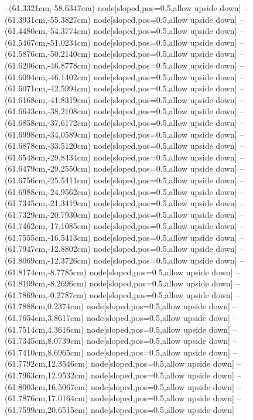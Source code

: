 --(61.3321cm,-58.6347cm) node[sloped,pos=0.5,allow upside down]{\ArrowIn}
--(61.3931cm,-55.3827cm) node[sloped,pos=0.5,allow upside down]{\ArrowIn}
--(61.4480cm,-54.3774cm) node[sloped,pos=0.5,allow upside down]{\ArrowIn}
--(61.5467cm,-51.0234cm) node[sloped,pos=0.5,allow upside down]{\ArrowIn}
--(61.5876cm,-50.2140cm) node[sloped,pos=0.5,allow upside down]{\arrowIn}
--(61.6206cm,-46.8778cm) node[sloped,pos=0.5,allow upside down]{\ArrowIn}
--(61.6094cm,-46.1402cm) node[sloped,pos=0.5,allow upside down]{\arrowIn}
--(61.6071cm,-42.5994cm) node[sloped,pos=0.5,allow upside down]{\ArrowIn}
--(61.6168cm,-41.8319cm) node[sloped,pos=0.5,allow upside down]{\arrowIn}
--(61.6643cm,-38.2108cm) node[sloped,pos=0.5,allow upside down]{\ArrowIn}
--(61.6858cm,-37.6172cm) node[sloped,pos=0.5,allow upside down]{\arrowIn}
--(61.6998cm,-34.0589cm) node[sloped,pos=0.5,allow upside down]{\ArrowIn}
--(61.6878cm,-33.5120cm) node[sloped,pos=0.5,allow upside down]{\arrowIn}
--(61.6548cm,-29.8434cm) node[sloped,pos=0.5,allow upside down]{\ArrowIn}
--(61.6479cm,-29.2550cm) node[sloped,pos=0.5,allow upside down]{\arrowIn}
--(61.6756cm,-25.5411cm) node[sloped,pos=0.5,allow upside down]{\ArrowIn}
--(61.6988cm,-24.9562cm) node[sloped,pos=0.5,allow upside down]{\arrowIn}
--(61.7345cm,-21.3419cm) node[sloped,pos=0.5,allow upside down]{\ArrowIn}
--(61.7329cm,-20.7930cm) node[sloped,pos=0.5,allow upside down]{\arrowIn}
--(61.7462cm,-17.1085cm) node[sloped,pos=0.5,allow upside down]{\ArrowIn}
--(61.7555cm,-16.5413cm) node[sloped,pos=0.5,allow upside down]{\arrowIn}
--(61.7947cm,-12.8802cm) node[sloped,pos=0.5,allow upside down]{\ArrowIn}
--(61.8069cm,-12.3726cm) node[sloped,pos=0.5,allow upside down]{\arrowIn}
--(61.8174cm,-8.7785cm) node[sloped,pos=0.5,allow upside down]{\ArrowIn}
--(61.8109cm,-8.2696cm) node[sloped,pos=0.5,allow upside down]{\arrowIn}
--(61.7869cm,-0.2787cm) node[sloped,pos=0.5,allow upside down]{\ArrowIn}
--(61.7888cm,0.2374cm) node[sloped,pos=0.5,allow upside down]{\arrowIn}
--(61.7654cm,3.8617cm) node[sloped,pos=0.5,allow upside down]{\ArrowIn}
--(61.7514cm,4.3616cm) node[sloped,pos=0.5,allow upside down]{\arrowIn}
--(61.7345cm,8.0739cm) node[sloped,pos=0.5,allow upside down]{\ArrowIn}
--(61.7410cm,8.6965cm) node[sloped,pos=0.5,allow upside down]{\arrowIn}
--(61.7792cm,12.3546cm) node[sloped,pos=0.5,allow upside down]{\ArrowIn}
--(61.7963cm,12.9532cm) node[sloped,pos=0.5,allow upside down]{\arrowIn}
--(61.8003cm,16.5067cm) node[sloped,pos=0.5,allow upside down]{\ArrowIn}
--(61.7876cm,17.0164cm) node[sloped,pos=0.5,allow upside down]{\arrowIn}
--(61.7599cm,20.6515cm) node[sloped,pos=0.5,allow upside down]{\ArrowIn}
